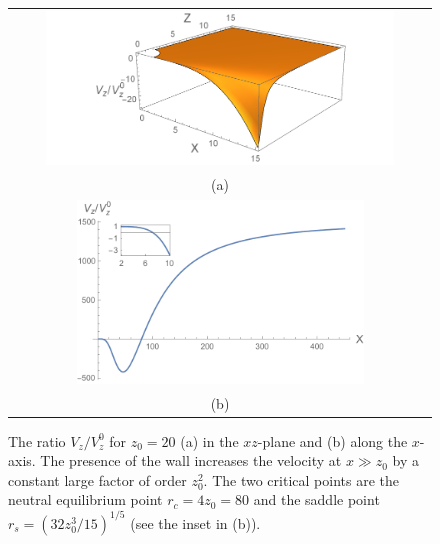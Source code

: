 \begin{figure}
\begin{center}
\begin{tabular}{c}
  \includegraphics[width=0.85\textwidth]{Fig2a.pdf} \\
  (a)  \\
  \includegraphics[width=0.7\textwidth]{Fig2b_extended_range.pdf}  \\
  (b) \\
\end{tabular}
\end{center}
\caption{The ratio $V_z/V_z^0$ for $z_0=20$  (a) in the $xz$-plane and (b) along the $x$-axis. The presence of the wall increases
the velocity at $x\gg z_0$ by a constant large factor of order $z_0^2$. The two critical points are the neutral equilibrium point $r_c=4z_0=80$
and the saddle point $r_s=(32 z_0^3/15)^{1/5}$ (see the inset in (b)).}
\label{Ratio1}
\end{figure}

